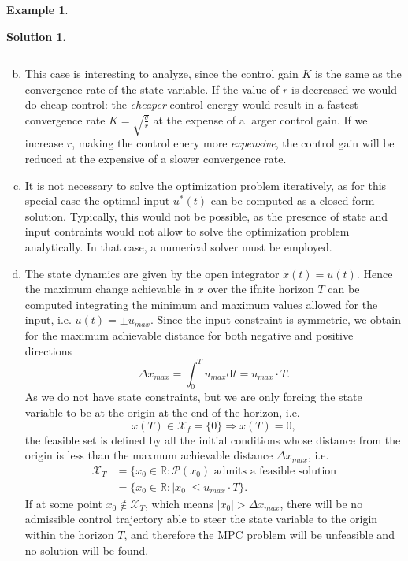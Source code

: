 \documentclass[a4paper,12 pt]{article}
\numberwithin{equation}{section}
\theoremstyle{definition}
\newtheorem{bsp}{Example}
\theoremstyle{remark}
\theoremstyle{definition}
\newtheorem*{lsg}{Solution}
\theoremstyle{definition}
\theoremstyle{definition}
\theoremstyle{remark}
\begin{document}
\begin{bsp}
\begin{lsg}
\begin{enumerate}[(a)]
\begin{equation*}
\end{equation*}
\item This case is interesting to analyze, since the control gain $K$ is the same as the convergence rate of the state variable. If the value of $r$ is decreased we would do cheap control: the \textit{cheaper} control energy would result in a fastest convergence rate $K=\sqrt{\frac{q}{r}}$ at the expense of a larger control gain. If we increase $r$, making the control enery more \textit{expensive}, the control gain will be reduced at the expensive of a slower convergence rate.
\item It is not necessary to solve the optimization problem iteratively, as for this special case the optimal input $u^*(t)$ can be computed as a closed form solution. Typically, this would not be possible, as the presence of state and input contraints would not allow to solve the optimization problem analytically. In that case, a numerical solver must be employed.
\item The state dynamics are given by the open integrator $\dot{x}(t)=u(t)$. Hence the maximum change achievable in $x$ over the ifnite horizon $T$ can be computed integrating the minimum and maximum values allowed for the input, i.e. $u(t)=\pm u_{max}$. Since the input constraint is symmetric, we obtain for the maximum achievable distance for both negative and positive directions
\begin{equation*}
\Delta x_{max}=\int_0^T u_{max} \text{d}t=u_{max} \cdot T.
\end{equation*}
As we do not have state constraints, but we are only forcing the state variable to be at the origin at the end of the horizon, i.e. $$x(T)\in \mathcal{X}_f=\{0\}\Rightarrow x(T)=0,$$ the feasible set is defined by all the initial conditions whose distance from the origin is less than the maxmum achievable distance $\Delta x_{max}$, i.e.
\begin{equation*}
\begin{split}
\mathcal{X}_T&=\{x_0\in \mathbb{R}: \mathcal{P}(x_0) \text{ admits a feasible solution}\\
&=\{ x_0 \in \mathbb{R}: |x_0|\leq u_{max}\cdot T\}.
\end{split}
\end{equation*}
If at some point $x_0 \not \in \mathcal{X}_T$, which means $|x_0|>\Delta x_{max}$, there will be no admissible control trajectory able to steer the state variable to the origin within the horizon $T$, and therefore the MPC problem will be unfeasible and no solution will be found.

\end{enumerate}
\end{lsg}
\end{bsp}
\end{document}

